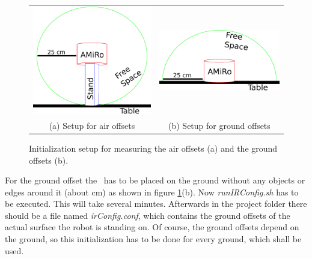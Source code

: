 \begin{figure}[htb]
\begin{center}
\begin{tabular}{cc}
\includegraphics[scale=0.35]{Bilder/MeasAirOffset.eps} &
\includegraphics[scale=0.35]{Bilder/MeasGroundOffset.eps} \\
(a) Setup for air offsets & (b) Setup for ground offsets \\
\end{tabular}
\caption{Initialization setup for measuring the air offsets (a) and the ground offsets (b).}
\label{fig:proxinit}
\end{center}
\end{figure}

For the ground offset the \amiro\ has to be placed on the ground without any objects or edges around it (about \unit[25]{cm}) as shown in figure \ref{fig:proxinit}(b). Now {\it runIRConfig.sh} has to be executed. This will take several minutes. Afterwards in the project folder there should be a file named {\it irConfig.conf}, which contains the ground offsets of the actual surface the robot is standing on. Of course, the ground offsets depend on the ground, so this initialization has to be done for every ground, which shall be used.

